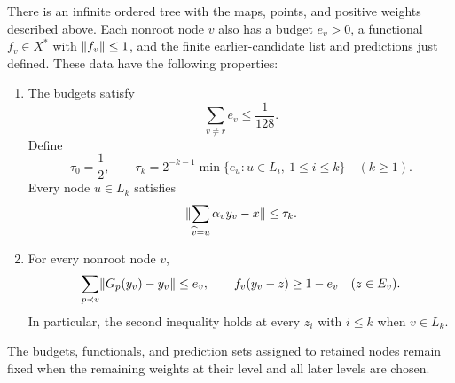 \begin{proposition}
\label{prop:tree-data}
There is an infinite ordered tree with the maps, points, and positive
weights described above.  Each nonroot node $v$ also has a budget
$e_v>0$, a functional $f_v\in X^*$ with $\lVert f_v\rVert\le1$, and the
finite earlier-candidate list and predictions just defined.  These
data have the following properties:
\begin{enumerate}
 \item The budgets satisfy
 \begin{equation}
   \sum_{v\ne r}e_v\le\frac1{128}.
   \label{eq:tree-budget}
 \end{equation}
 Define
 \begin{equation}
  \tau_0=\frac12,\qquad
  \tau_k=2^{-k-1}
       \min\{e_u:u\in L_i,\ 1\le i\le k\}\quad(k\ge1).
  \label{eq:tree-tolerance}
 \end{equation}
 Every node $u\in L_k$ satisfies
 \begin{equation}
  \lVert\sum_{\widehat v=u}\alpha_v y_v-x\rVert\le\tau_k.
  \label{eq:child-average}
 \end{equation}
 \item For every nonroot node $v$,
 \begin{equation}
  \sum_{p\prec v}\lVert G_p(y_v)-y_v\rVert\le e_v,
  \qquad
  f_v(y_v-z)\ge1-e_v\quad(z\in E_v).
  \label{eq:tree-conditions}
 \end{equation}
 In particular, the second inequality holds at every $z_i$ with
 $i\le k$ when $v\in L_k$.
\end{enumerate}
The budgets, functionals, and prediction sets assigned to retained
nodes remain fixed when the remaining weights at their level and all
later levels are chosen.
\end{proposition}


